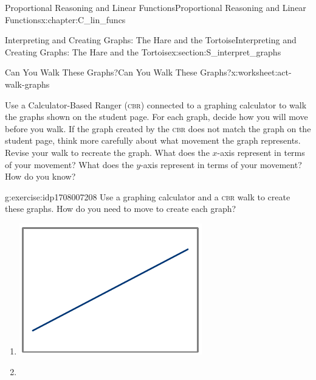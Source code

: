 \documentclass[oneside,10pt,]{book}
\newcommand{\initialism}[1]{\textsc{\MakeLowercase{#1}}}
\numberwithin{equation}{chapter}
\begin{document}
\begin{chapterptx}{Proportional Reasoning and Linear Functions}{}{Proportional Reasoning and Linear Functions}{}{}{x:chapter:C_lin_funcs}
\begin{sectionptx}{Interpreting and Creating Graphs: The Hare and the Tortoise}{}{Interpreting and Creating Graphs: The Hare and the Tortoise}{}{}{x:section:S_interpret_graphs}
\begin{worksheet-subsection}{Can You Walk These Graphs?}{}{Can You Walk These Graphs?}{}{}{x:worksheet:act-walk-graphs}
\begin{introduction}{}%
Use a Calculator-Based Ranger (\initialism{CBR}) connected to a graphing calculator to walk the graphs shown on the student page. For each graph, decide how you will move before you walk. If the graph created by the \initialism{CBR} does not match the graph on the student page, think more carefully about what movement the graph represents. Revise your walk to recreate the graph. What does the \(x\)-axis represent in terms of your movement? What does the \(y\)-axis represent in terms of your movement? How do you know?%
\end{introduction}%
\begin{divisionexercise}{1}{}{}{g:exercise:idp1708007208}%
Use a graphing calculator and a \initialism{CBR} walk to create these graphs. How do you need to move to create each graph?%
\begin{enumerate}[font=\bfseries,label=(\alph*),ref=\alph*]
\item{}\begin{image}{0.325}{0.35}{0.325}%
\includegraphics[width=\linewidth]{external/walk-graphs-1.pdf}
\end{image}%
%
\item{}\begin{image}{0.325}{0.35}{0.325}%

\end{image}
\end{enumerate}
\end{divisionexercise}
\end{worksheet-subsection}
\end{sectionptx}
\end{chapterptx}
\end{document}
